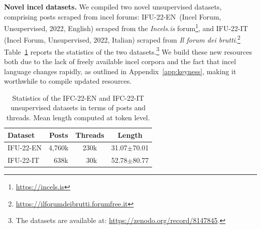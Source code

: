 \documentclass[11pt]{article}
\newcommand{\dsENcorpus}{IFU-22-EN}
\newcommand{\dsITcorpus}{IFU-22-IT}
\begin{document}
\vspace*{1mm}\noindent\textbf{Novel incel datasets.} We compiled two novel unsupervised datasets, comprising posts scraped from incel forums: \dsENcorpus\, (Incel Forum, Unsupervised, 2022, English) scraped from the \textit{Incels.is} forum\footnote{\url{https://incels.is}}, and \dsITcorpus\, (Incel Forum, Unsupervised, 2022, Italian) scraped from \textit{Il forum dei brutti}.\footnote{\url{https://ilforumdeibrutti.forumfree.it}}
Table~\ref{tab:english-italian-unsupervised-datasets-stats} reports the statistics of the two datasets.\footnote{The datasets are available at: \url{https://zenodo.org/record/8147845}.} We build these new resources both due to the lack of freely available incel corpora and the fact that incel language changes rapidly, as outlined in Appendix~\ref{app:keyness}, making it worthwhile to compile updated resources.

\renewcommand{\arraystretch}{0.9}

\begin{table}[t]
  \centering
  \caption{Statistics of the IFC-22-EN and IFC-22-IT unsupervised datasets in terms of posts and threads. Mean length computed at token level.}
  \begin{tabular}{l|ccc}
      \hline
      \textbf{Dataset} & \textbf{Posts} & \textbf{Threads} & \textbf{Length} \\
      \hline
      \dsENcorpus & 4,760k & 230k & 31.07$\pm$70.01 \\
      \dsITcorpus & \,\,\,\,638k & \,\,\,30k & 52.78$\pm$80.77 \\
      \hline
  \end{tabular}
  \label{tab:english-italian-unsupervised-datasets-stats}
\end{table}
\end{document}
